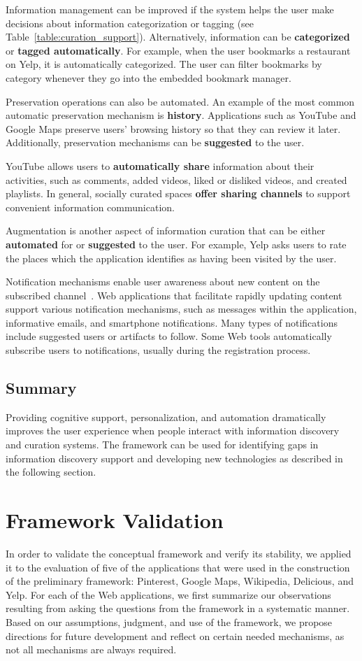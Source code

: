 \documentclass{sigchi}
\begin{document}
{{Information management can be improved if the system helps the user make decisions about information categorization or tagging (see Table~\ref{table:curation_support}). Alternatively, information can be \textbf{categorized} or \textbf{tagged automatically}. For example, when the user bookmarks a restaurant on Yelp, it is automatically categorized. The user can filter bookmarks by category whenever they go into the embedded bookmark manager. 

Preservation operations can also be automated. An example of the most common automatic preservation mechanism is \textbf{history}. Applications such as YouTube and Google Maps preserve users' browsing history so that they can review it later. Additionally, preservation mechanisms can be \textbf{suggested} to the user.


YouTube allows users to \textbf{automatically share} information about their activities, such as comments,  added videos, liked or disliked videos, and created playlists. In general, socially curated spaces \textbf{offer sharing channels} to support convenient information communication.
 
Augmentation is another aspect of information curation that can be either \textbf{automated} for or \textbf{suggested} to the user. For example, Yelp asks users to rate the places which the application identifies as having been visited by the user. 


Notification mechanisms enable user awareness about new content on the subscribed channel~\cite{millen2005social}. Web applications that facilitate rapidly updating content support various notification mechanisms, such as messages within the application, informative emails, and smartphone notifications. Many types of notifications include suggested users or artifacts to follow. Some Web tools automatically subscribe users to notifications, usually during the registration process.
} %
{\subsection{Summary}
Providing cognitive support, personalization, and automation dramatically improves the user experience when people interact with information discovery and curation systems. The framework can be used for identifying gaps in information discovery support and developing new technologies as described in the following section.  
}
}

\section{Framework Validation}
\label{section:validation}
In order to validate the conceptual framework and verify its stability, we applied it to the evaluation of five of the applications that were used in the construction of the preliminary framework: Pinterest, Google Maps, Wikipedia, Delicious, and Yelp. For each of the Web applications, we first summarize our observations resulting from asking the questions from the framework in a systematic manner. Based on our assumptions, judgment, and use of the framework, we propose directions for future development and reflect on certain needed mechanisms, as not all mechanisms are always required.  
\end{document}
